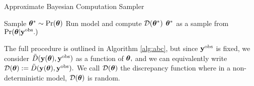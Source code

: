 \begin{algorithm}[htbp]
    \caption{Approximate Bayesian Computation Sampler}
    \label{alg:abc}
    \begin{algorithmic}
        \State Sample $\bm{\theta}^\ast \sim \Pr(\bm{\theta})$
        \State Run model and compute $\mathcal{D}(\bm{\theta}^\ast)$
        \State \Return $\bm{\theta}^\ast$ as a sample from $\Pr(\bm{\theta}|\mathbf{y}^{\mathrm{obs}}.)$
        \EndIf
    \end{algorithmic}
\end{algorithm}

The full procedure is outlined in Algorithm \ref{alg:abc}, but since 
$\mathbf{y}^{\mathrm{obs}}$ is fixed, we consider $\tilde{D}(\mathbf{y}(\bm{\theta}), \mathbf{y}^{\mathrm{obs}})$ as a
function of $\bm{\theta},$ and
we can equivalently write 
$\mathcal{D}(\bm{\theta}) := \tilde{D}(\mathbf{y}(\bm{\theta}), \mathbf{y}^{\mathrm{obs}}).$
We call $\mathcal{D}(\bm{\theta})$ the discrepancy function where in a
non-deterministic model, $\mathcal{D}(\bm{\theta})$ is random.